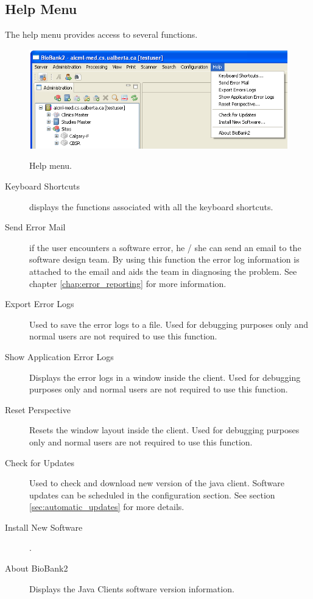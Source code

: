 \subsection{Help Menu}
The help menu provides access to several functions.
\begin{figure}[H]
  \centering
  \scalebox{0.5}
	   { \includegraphics*{screenshots/overview/main_menu_help} }
	   \caption{Help menu.}
	   \label{fig:main_menu_help}
\end{figure}
\begin{description}
\item[Keyboard Shortcuts] displays the functions associated with all the
  keyboard shortcuts.
\item[Send Error Mail] if the user encounters a software error, he / she can
  send an email to the software design team. By using this function the error
  log information is attached to the email and aids the team in diagnosing the
  problem. See chapter \ref{chap:error_reporting} for more information.
\item[Export Error Logs] Used to save the error logs to a file. Used for
  debugging purposes only and normal users are not required to use this
  function.
\item[Show Application Error Logs] Displays the error logs in a window inside
  the client. Used for debugging purposes only and normal users are not
  required to use this function.
\item[Reset Perspective] Resets the window layout inside the client. Used for
  debugging purposes only and normal users are not required to use this
  function.
\item[Check for Updates] Used to check and download new version of the java
client. Software updates can be scheduled in the configuration section. See
section \ref{sec:automatic_updates} for more details.
\item[Install New Software] .
\item[About BioBank2] Displays the Java Clients software version information.
\end{description}

